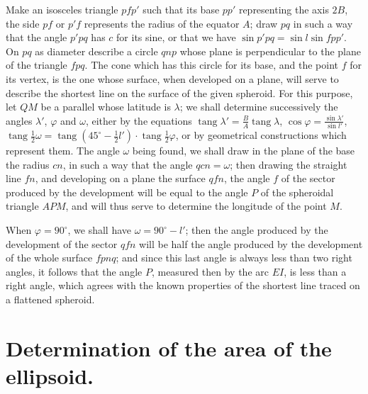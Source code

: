 \documentclass{article}
\begin{document}

Make an isosceles triangle $pfp'$ such that its base $pp'$ representing the axis $2B$, the side $pf$ or $p'f$ represents the radius of the equator $A$; draw $pq$ in such a way that the angle $p'pq$ has $c$ for its sine, or that we have $\sin p'pq=\sin l\sin fpp'$. On $pq$ as diameter describe a circle $qnp$ whose plane is perpendicular to the plane of the triangle $fpq$. The cone which has this circle for its base, and the point $f$ for its vertex, is the one whose surface, when developed on a plane, will serve to describe the shortest line on the surface of the given spheroid. For this purpose, let $QM$ be a parallel whose latitude is $\lambda$; we shall determine successively the angles $\lambda'$, $\varphi$ and $\omega$, either by the equations $\operatorname{tang}\lambda'=\frac{B}{A}\operatorname{tang}\lambda$, $\cos\varphi=\frac{\sin\lambda'}{\sin l'}$, $\operatorname{tang}\frac{1}{2}\omega=\operatorname{tang}(45^{\circ}-\frac{1}{2}l')\cdot\operatorname{tang}\frac{1}{2}\varphi$, or by geometrical constructions which represent them. The angle $\omega$ being found, we shall draw in the plane of the base the radius $cn$, in such a way that the angle $qcn=\omega$; then drawing the straight line $fn$, and developing on a plane the surface $qfn$, the angle $f$ of the sector produced by the development will be equal to the angle $P$ of the spheroidal triangle $APM$, and will thus serve to determine the longitude of the point $M$.

When $\varphi=90^{\circ}$, we shall have $\omega=90^{\circ}-l'$; then the angle produced by the development of the sector $qfn$ will be half the angle produced by the development of the whole surface $fpnq$; and since this last angle is always less than two right angles, it follows that the angle $P$, measured then by the arc $EI$, is less than a right angle, which agrees with the known properties of the shortest line traced on a flattened spheroid.

\section*{Determination of the area of the ellipsoid.}
\end{document}
